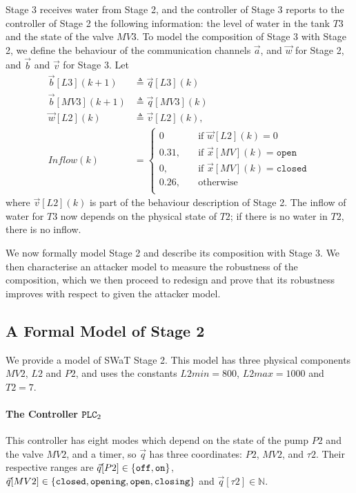{Stage 3 receives water from Stage 2, and the controller of Stage 3 reports to the controller of Stage 2 the following information: the level of water in the tank $T3$ and the state of the valve $MV3$. To model the composition of Stage 3 with Stage 2, we define the behaviour of the communication channels $\vec{a}$, and $\vec{w}$ for Stage 2, and $\vec{b}$ and $\vec{v}$ for Stage 3. Let  
\begin{align}
  \vec{b}[L3](k+1)&\triangleq \vec{q}[L3](k)\\
  \vec{b}[MV3](k+1)&\triangleq \vec{q}[MV3](k)\\
  \vec{w}[L2](k)&\triangleq \vec{v}[L2](k),\\
  Inflow(k)&=\begin{cases}
    0 & \quad \text{if $\vec{w}[L2](k)=0$}\\
    0.31,&\quad \text{if $\vec{x}[MV](k)=\texttt{open}$}\\
    0,&\quad \text{if $\vec{x}[MV](k)=\texttt{closed}$}\\
    0.26,&\quad \text{otherwise}\\
  \end{cases}
\end{align}
where $\vec{v}[L2](k)$ is part of the behaviour description of Stage 2. The inflow of water for $T3$ now depends on the physical state of $T2$; if there is no water in $T2$, there is no inflow.

We now formally model Stage 2 and describe its composition with Stage 3. We then characterise an attacker model to measure the robustness of the composition, which we then proceed to redesign and prove that its robustness improves with respect to given the attacker model.

\subsection{A Formal Model of Stage 2}
We provide a model of SWaT Stage 2. This model has three physical components $MV2$, $L2$ and $P2$, and uses the constants $L2min=800$, $L2max=1000$ and $T2=7$.

\paragraph{The Controller $\texttt{PLC}_2$} 
This controller has eight modes which depend on the state of the pump $P2$ and the valve $MV2$, and a timer, so $\vec{q}$ has three coordinates: $P2$, $MV2$, and $\tau2$. Their respective ranges are $\vec{q}[P2]\in\left\{\texttt{off},\texttt{on}\right\}$, $\vec{q}[MV2]\in\left\{\texttt{closed},\texttt{opening},\texttt{open},\texttt{closing}\right\}$ and $\vec{q}[\tau2]\in\mathbb{N}$. 

}
